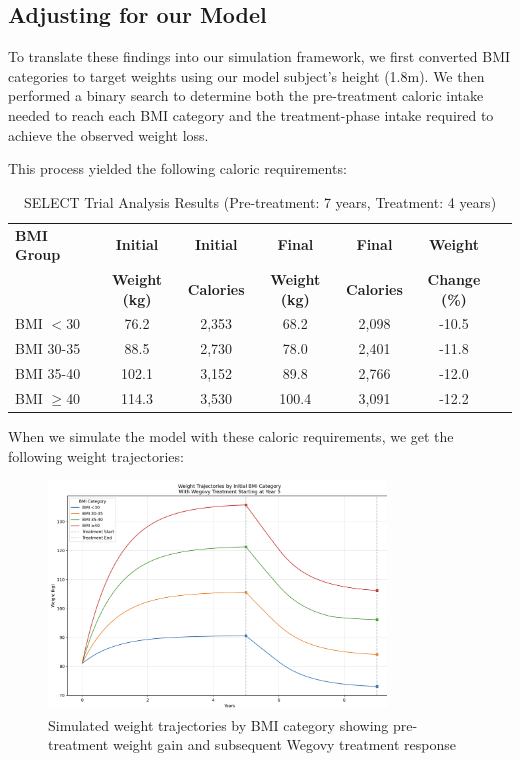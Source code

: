 \subsection{Adjusting for our Model}
To translate these findings into our simulation framework, we first converted BMI categories to target weights using our model subject's height (1.8m). We then performed a binary search to determine both the pre-treatment caloric intake needed to reach each BMI category and the treatment-phase intake required to achieve the observed weight loss.

This process yielded the following caloric requirements:

\begin{table}[!htb]
\centering
\begin{tabular}{|l|c|c|c|c|c|c|}
\hline
\textbf{BMI Group} & \textbf{Initial} & \textbf{Initial} & \textbf{Final} & \textbf{Final} & \textbf{Weight} \\
& \textbf{Weight (kg)} & \textbf{Calories} & \textbf{Weight (kg)} & \textbf{Calories} & \textbf{Change (\%)} \\
\hline
BMI $<$30 & 76.2 & 2,353 & 68.2 & 2,098 & -10.5 \\
BMI 30-35 & 88.5 & 2,730 & 78.0 & 2,401 & -11.8 \\
BMI 35-40 & 102.1 & 3,152 & 89.8 & 2,766 & -12.0 \\
BMI $\geq$40 & 114.3 & 3,530 & 100.4 & 3,091 & -12.2 \\
\hline
\end{tabular}
\caption{SELECT Trial Analysis Results (Pre-treatment: 7 years, Treatment: 4 years)}
\end{table}

When we simulate the model with these caloric requirements, we get the following weight trajectories:

\begin{figure}[!htb]
\centering
\includegraphics[width=0.8\textwidth]{images/wegovy_weights_plot.png}
\caption{Simulated weight trajectories by BMI category showing pre-treatment weight gain and subsequent Wegovy treatment response}
\label{fig:wegovy_weights}
\end{figure}

